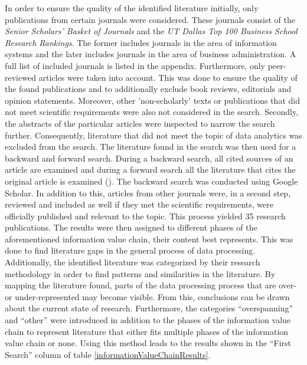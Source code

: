 In order to ensure the quality of the identified literature initially, only publications from certain journals were considered. These journals consist of the \textit{Senior Scholars' Basket of Journals} and the \textit{UT Dallas Top 100 Business School Research Rankings}. The former includes journals in the area of information systems and the later includes journals in the area of business administration. A full list of included journals is listed in the appendix. Furthermore, only peer-reviewed articles were taken into account. This was done to ensure the quality of the found publications and to additionally exclude book reviews, editorials and opinion statements. Moreover, other 'non-scholarly' texts or publications that did not meet scientific requirements were also not considered in the search. Secondly, the abstracts of the particular articles were inspected to narrow the search further. Consequently, literature that did not meet the topic of data analytics was excluded from the search. %
The literature found in the search was then used for a backward and forward search. During a backward search, all cited sources of an article are examined and during a forward search all the literature that cites the original article is examined (\cite{Webster.2002}). The backward search was conducted using Google Scholar. In addition to this, articles from other journals were, in a second step, reviewed and included as well if they met the scientific requirements, were officially published and relevant to the topic. This process yielded 35 research publications. The results were then assigned to different phases of the aforementioned information value chain, their content best represents. This was done to find literature gaps in the general process of data processing. Additionally, the identified literature was categorized by their research methodology in order to find patterns and similarities in the literature. 
By mapping the literature found, parts of the data processing process that are over- or under-represented may become visible. From this, conclusions can be drawn about the current state of research. Furthermore, the categories \enquote{overspanning} and \enquote{other} were introduced in addition to the phases of the information value chain to represent literature that either fits multiple phases of the information value chain or none. Using this method leads to the results shown in the \enquote{First Search} column of table \ref{informationValueChainResults}.

